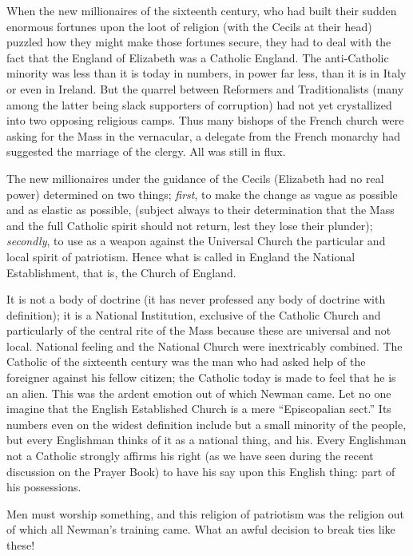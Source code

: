 When the new millionaires of the sixteenth century,
who had built their sudden enormous fortunes upon the loot of religion
(with the Cecils at their head) puzzled how they might make those
fortunes secure, they had to deal with the fact that the England of
Elizabeth was a Catholic England. The anti-Catholic minority was less
than it is today in numbers, in power far less, than it is in Italy or
even in Ireland. But the quarrel between Reformers and Traditionalists
(many among the latter being slack supporters of corruption) had not yet
crystallized into two opposing religious camps. Thus many bishops of the
French church were asking for the Mass in the vernacular, a delegate
from the French monarchy had suggested the marriage of the clergy. All
was still in flux.

The new millionaires under the guidance of the
Cecils (Elizabeth had no real power) determined on two things; \emph{first},
to make the change as vague as possible and as elastic as possible,
(subject always to their determination that the Mass and the full
Catholic spirit should not return, lest they lose their plunder); \emph{secondly},
to use as a weapon against the Universal Church the particular and local
spirit of patriotism. Hence what is called in England the National
Establishment, that is, the Church of England.

It is not a body of doctrine (it has never
professed any body of doctrine with definition); it is a National
Institution, exclusive of the Catholic Church and particularly of the
central rite of the Mass because these are universal and not local. National feeling and the National Church were inextricably combined. The
Catholic of the sixteenth century was the man who had asked help of the
foreigner against his fellow citizen; the Catholic today is made to feel
that he is an alien. This was the ardent emotion out of which Newman
came. Let no one imagine that the English Established Church is a mere ``Episcopalian
sect.'' Its numbers even on the widest definition include but a small
minority of the people, but every Englishman thinks of it as a national
thing, and his. Every Englishman not a Catholic strongly affirms his
right (as we have seen during the recent discussion on the Prayer Book)
to have his say upon this English thing: part of his possessions.

Men must worship something, and this religion of
patriotism was the religion out of which all Newman's training came.
What an awful decision to break ties like these!

